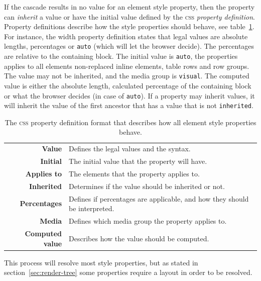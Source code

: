 \documentclass[a4paper,11pt]{kth-mag}
\newcommand{\code}[1]{\texttt{#1}}
\begin{document}
        If the cascade results in no value for an element style property, then the property can \emph{inherit} a value or have the initial value defined by the \textsc{css} \emph{property definition}.
        Property definitions describe how the style properties should behave, see table~\ref{table:css_property_definition}.
        For instance, the width property definition states that legal values are absolute lengths, percentages or \code{auto} (which will let the browser decide).
        The percentages are relative to the containing block.
        The initial value is \code{auto}, the properties applies to all elements non-replaced inline elements, table rows and row groups.
        The value may not be inherited, and the media group is \code{visual}.
        The computed value is either the absolute length, calculated percentage of the containing block or what the browser decides (in case of \code{auto}).
        If a property may inherit values, it will inherit the value of the first ancestor that has a value that is not \code{inherited}.

        \begin{table}[ht]\center
          \tiny
          \begin{tabular}[t]{ r | l }
            \textbf{Value} & Defines the legal values and the syntax. \\
            \textbf{Initial} & The initial value that the property will have. \\
            \textbf{Applies to} & The elements that the property applies to. \\
            \textbf{Inherited} & Determines if the value should be inherited or not. \\
            \textbf{Percentages} & Defines if percentages are applicable, and how they should be interpreted. \\
            \textbf{Media} & Defines which media group the property applies to. \\
            \textbf{Computed value} & Describes how the value should be computed. \\
          \end{tabular}
          \caption{The \textsc{css} property definition format that describes how all element style properties behave.}
          \label{table:css_property_definition}
        \end{table}

        This process will resolve most style properties, but as stated in section~\ref{sec:render-tree} some properties require a layout in order to be resolved.
\end{document}

